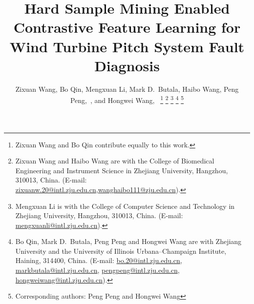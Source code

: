 \documentclass[lettersize,journal]{IEEEtran}
\begin{document}
\title{Hard Sample Mining Enabled Contrastive Feature Learning for Wind Turbine Pitch System Fault Diagnosis}


\author{Zixuan Wang, Bo Qin, Mengxuan Li, Mark D.\ Butala, Haibo Wang, Peng Peng,~, and Hongwei Wang,~
\thanks{Zixuan Wang and Bo Qin contribute equally to this work.}
\thanks{Zixuan Wang and Haibo Wang are with the College of Biomedical Engineering and Instrument Science in Zhejiang University, Hangzhou, 310013, China. (E-mail: \href{mailto:zixuanw.20@intl.zju.edu.cn}{zixuanw.20@intl.zju.edu.cn},\href{mailto:wanghaibo111@zju.edu.cn}{wanghaibo111@zju.edu.cn}).}
\thanks{Mengxuan Li is with the College of Computer Science and Technology in Zhejiang University, Hangzhou, 310013, China. (E-mail: \href{mailto:mengxuanli@intl.zju.edu.cn}{mengxuanli@intl.zju.edu.cn}).}
\thanks{Bo Qin, Mark D.\ Butala, Peng Peng and Hongwei Wang are with Zhejiang University and the University of Illinois Urbana–Champaign Institute, Haining, 314400, China. (E-mail:  \href{mailto:bo.20@intl.zju.edu.cn}{bo.20@intl.zju.edu.cn}, 
\href{mailto:markbutala@intl.zju.edu.cn}{markbutala@intl.zju.edu.cn}, \href{mailto:pengpeng@intl.zju.edu.cn}{pengpeng@intl.zju.edu.cn}, \href{mailto:hongweiwang@intl.zju.edu.cn}{hongweiwang@intl.zju.edu.cn}).}
\thanks{Corresponding authors: Peng Peng and Hongwei Wang}
        }
\end{document}
